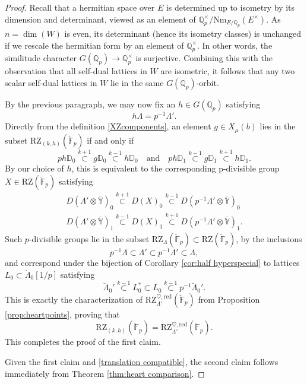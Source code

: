 \documentclass[11pt]{alggeom}
\newcommand{\red}{\mathrm{red}}
\newcommand{\Q}{\mathbb Q}
\newcommand{\F}{\mathbb F}
\begin{document}
\begin{proof}
Recall that a hermitian space over $E$ is determined up to isometry by its dimension and determinant, viewed as an element of $\Q_p^\times/ \mathrm{Nm}_{E/\Q_p} (E^\times)$.  
As $n=\dim(W)$ is even, its determinant (hence its isometry classes) is unchanged if we rescale the hermitian form by an element of $\Q_p^\times$.  In other words, the similitude character $G(\Q_p) \to \Q_p^\times$ is surjective.  Combining this with the observation that all self-dual lattices in $W$ are isometric, it follows that any two scalar self-dual lattices in $W$ lie in the same $G(\Q_p)$-orbit.


By the previous paragraph, we may now fix an $h \in G(\Q_p)$ satisfying 
\[
h \Lambda = p^{-1}\Lambda'.
\]
Directly from the definition \eqref{XZcomponents}, an element $g\in X_\mu(b)$  lies in the subset $\mathrm{RZ}_{(k,h)}(\breve{\F}_p)$ if and only if 
\[
ph  \mathbb{D}_0   \stackrel{k+1}{\subset}  g \mathbb{D}_0  \stackrel{k-1}{\subset} h \mathbb{D}_0
\quad \mbox{and} \quad
p h\mathbb{D}_1   \stackrel{k-1}{\subset}  g \mathbb{D}_1  \stackrel{k+1}{\subset}  h\mathbb{D}_1.
\]
By our choice of $h$,  this is equivalent to the corresponding p-divisible group $X \in \mathrm{RZ}(\breve{\F}_p)$ satisfying
\begin{align*}
  D( \Lambda' \otimes\overline{\mathbb{Y}})_0
  \stackrel{k+1}{\subset}  
  D(X)_0  
  \stackrel{k-1}{\subset} 
 D( p^{-1}\Lambda' \otimes\overline{\mathbb{Y}})_0  \\  
 D( \Lambda'  \otimes\overline{\mathbb{Y}})_1
  \stackrel{k-1}{\subset}  
  D(X)_1  
  \stackrel{k+1}{\subset} 
D(p^{-1}\Lambda' \otimes\overline{\mathbb{Y}})_1.
  \end{align*}
Such $p$-divisible groups lie in the subset $\mathrm{RZ}_\Lambda(\breve{\F}_p) \subset \mathrm{RZ}(\breve{\F}_p)$, by the inclusions 
\[
p^{-1}\Lambda \subset \Lambda' \subset p^{-1}\Lambda' \subset \Lambda, 
\]
and correspond under the bijection of Corollary \ref{cor:half hyperspecial}  to lattices $L_0 \subset \breve{\Lambda}_0[1/p]$
satisfying
\[
\breve{\Lambda}_0' \stackrel{k-1}{\subset} L_0^* \subset L_0 \stackrel{k-1}{\subset} p^{-1} \breve{\Lambda}_0' .
\]
This is exactly the characterization of $\mathrm{RZ}_{\Lambda'}^{\heartsuit,\red}(\breve{\F}_p)$ from Proposition \ref{prop:heartpoints}, proving that 
\[
\mathrm{RZ}_{(k,h)}(\breve{\F}_p) = \mathrm{RZ}_{\Lambda'}^{\heartsuit,\red}(\breve{\F}_p).
\]
This completes the proof of the first claim.

Given the first claim and \eqref{translation compatible}, the second claim follows immediately from Theorem \ref{thm:heart comparison}. 
\end{proof}
\end{document}
